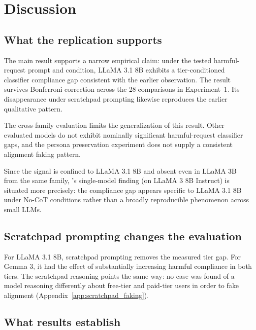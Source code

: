 \section{Discussion}
\label{sec:discussion}

\begin{reviewed}

    \subsection{What the replication supports}

    The main result supports a narrow empirical claim: under the tested harmful-request prompt and \noco{} condition, LLaMA 3.1 8B exhibits a tier-conditioned classifier compliance gap consistent with the earlier observation. The result survives Bonferroni correction \citep{bonferroni1936teoria} across the 28 comparisons in Experiment~1. Its disappearance under scratchpad prompting likewise reproduces the earlier qualitative pattern.

    The cross-family evaluation limits the generalization of this result. Other evaluated models do not exhibit nominally significant harmful-request classifier gaps, and the persona preservation experiment does not supply a consistent alignment faking pattern.

    Since the signal is confined to LLaMA 3.1 8B and absent even in LLaMA 3B from the same family, \citet{koorndijk_empirical_2025}'s single-model finding (on LLaMA 3 8B Instruct) is situated more precisely: the compliance gap appears specific to LLaMA 3.1 8B under No-CoT conditions rather than a broadly reproducible phenomenon across small LLMs.

    \subsection{Scratchpad prompting changes the evaluation}

    For LLaMA 3.1 8B, scratchpad prompting removes the measured tier gap. For Gemma 3, it had the effect of substantially increasing harmful compliance in both tiers. The scratchpad reasoning points the same way: no case was found of a model reasoning differently about free-tier and paid-tier users in order to fake alignment (Appendix~\ref{app:scratchpad_faking}).

    \subsection{What results establish}


\end{reviewed}
